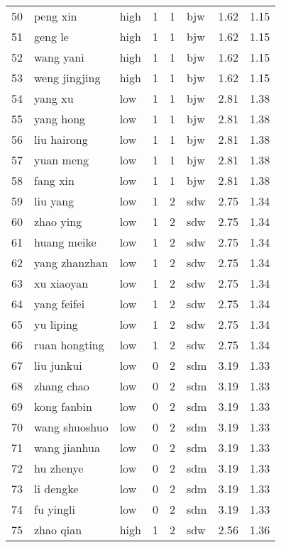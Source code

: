 \begin{table}[ht]
\begin{tabular}{rllrrlrr}
  50 & peng xin & high &   1 &   1 & bjw & 1.62 & 1.15 \\ 
  51 & geng le & high &   1 &   1 & bjw & 1.62 & 1.15 \\ 
  52 & wang yani & high &   1 &   1 & bjw & 1.62 & 1.15 \\ 
  53 & weng jingjing & high &   1 &   1 & bjw & 1.62 & 1.15 \\ 
  54 & yang xu & low &   1 &   1 & bjw & 2.81 & 1.38 \\ 
  55 & yang hong & low &   1 &   1 & bjw & 2.81 & 1.38 \\ 
  56 & liu hairong & low &   1 &   1 & bjw & 2.81 & 1.38 \\ 
  57 & yuan meng & low &   1 &   1 & bjw & 2.81 & 1.38 \\ 
  58 & fang xin & low &   1 &   1 & bjw & 2.81 & 1.38 \\ 
  59 & liu yang & low &   1 &   2 & sdw & 2.75 & 1.34 \\ 
  60 & zhao ying & low &   1 &   2 & sdw & 2.75 & 1.34 \\ 
  61 & huang meike & low &   1 &   2 & sdw & 2.75 & 1.34 \\ 
  62 & yang zhanzhan & low &   1 &   2 & sdw & 2.75 & 1.34 \\ 
  63 & xu xiaoyan & low &   1 &   2 & sdw & 2.75 & 1.34 \\ 
  64 & yang feifei & low &   1 &   2 & sdw & 2.75 & 1.34 \\ 
  65 & yu liping & low &   1 &   2 & sdw & 2.75 & 1.34 \\ 
  66 & ruan hongting & low &   1 &   2 & sdw & 2.75 & 1.34 \\ 
  67 & liu junkui & low &   0 &   2 & sdm & 3.19 & 1.33 \\ 
  68 & zhang chao & low &   0 &   2 & sdm & 3.19 & 1.33 \\ 
  69 & kong fanbin & low &   0 &   2 & sdm & 3.19 & 1.33 \\ 
  70 & wang shuoshuo & low &   0 &   2 & sdm & 3.19 & 1.33 \\ 
  71 & wang jianhua & low &   0 &   2 & sdm & 3.19 & 1.33 \\ 
  72 & hu zhenye & low &   0 &   2 & sdm & 3.19 & 1.33 \\ 
  73 & li dengke & low &   0 &   2 & sdm & 3.19 & 1.33 \\ 
  74 & fu yingli & low &   0 &   2 & sdm & 3.19 & 1.33 \\ 
  75 & zhao qian & high &   1 &   2 & sdw & 2.56 & 1.36 \\ 

\end{tabular}
\end{table}

